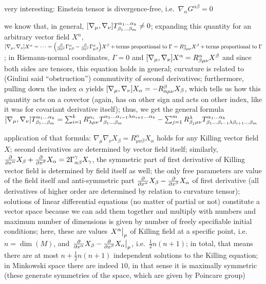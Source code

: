 \documentclass[ART_main.tex]{subfiles}
\begin{document}
very interesting: Einstein tensor is divergence-free, i.e.~$\nabla_\alpha G^{\alpha \beta} = 0$

we know that, in general, $\qty[\nabla_\mu, \nabla_\nu] T^{\alpha_1 \dots \alpha_k}_{\beta_1 \dots \beta_m} \neq 0$; expanding this quantity for an arbitrary vector field $X^\alpha$, $\qty[\nabla_\mu, \nabla_\nu] X^\alpha = \dots = \qty(\pdv{x^\mu} \Gamma_{\nu \beta}^\alpha - \pdv{x^\nu} \Gamma_{\mu \beta}^\alpha) X^\beta + \text{terms proportional to } \Gamma = R^\alpha_{\beta \mu \nu} X^\beta + \text{terms proportional to } \Gamma$; in Riemann-normal coordinates, $\Gamma = 0$ and $\qty[\nabla_\mu, \nabla_\nu] X^\alpha = R^\alpha_{\beta \mu \nu} X^\beta$ and since both sides are tensors, this equation holds in general; curvature is related to (Giulini said \enquote{obstruction}) commutivity of second derivatives; furthermore, pulling down the index $\alpha$ yields $\qty[\nabla_\mu, \nabla_\nu] X_\alpha = - R^\beta_{\alpha \mu \nu} X_\beta$, which tells us how this quantity acts on a covector (again, has on other sign and acts on other index, like it was for covariant derivative itself); thus, we get the general formula $\qty[\nabla_\mu, \nabla_\nu] T^{\alpha_1 \dots \alpha_k}_{\beta_1 \dots \beta_m} = \sum_{i = 1}^k R^{\alpha_i}_{\lambda \mu \nu} T^{\alpha_1 \dots \alpha_{i - 1} \lambda \alpha_{i + 1} \dots \alpha_k}_{\beta_1 \dots \beta_m} - \sum_{j = 1}^m R^\lambda_{\beta_j \mu \nu} T^{\alpha_1 \dots \alpha_k}_{\beta_1 \dots \beta_{i - 1} \lambda \beta_{i + 1} \dots \beta_m}$

application of that formula: $\nabla_\mu \nabla_\nu X_\beta = R^\alpha_{\mu \nu \beta} X_\alpha$ holds for any Killing vector field $X$; second derivatives are determined by vector field itself; similarly, $\pdv{x^\alpha} X_\beta + \pdv{x^\beta} X_\alpha = 2 \Gamma_{\alpha \beta}^\gamma X_\gamma$, the symmetric part of first derivative of Killing vector field is determined by field itself as well; the only free parameters are value of the field itself and anti-symmetric part $\pdv{x^\alpha} X_\beta - \pdv{x^\beta} X_\alpha$ of first derivative (all derivatives of higher order are determined by relation to curvature tensor); solutions of linear differential equations (no matter of partial or not) constitute a vector space because we can add them together and multiply with numbers and maximum number of dimensions is given by number of freely specifiable initial conditions; here, these are values $\eval{X^\alpha}_p$ of Killing field at a specific point, i.e.~$n = \dim(M)$, and $\eval{\pdv{x^\alpha} X_\beta - \pdv{x^\beta} X_\alpha}_p$, i.e.~$\frac{1}{2} n (n + 1)$; in total, that means there are at most $n + \frac{1}{2} n (n + 1)$ independent solutions to the Killing equation; in Minkowski space there are indeed $10$, in that sense it is maximally symmetric (these generate symmetries of the space, which are given by Poincare group)
\end{document}
